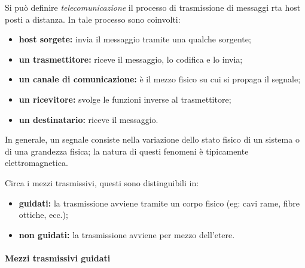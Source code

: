 \documentclass{subfiles}
\begin{document}
Si può definire \emph{telecomunicazione} il processo di trasmissione di messaggi rta host posti a distanza.
In tale processo sono coinvolti:
\begin{itemize}
    \item \textbf{host sorgete:} invia il messaggio tramite una qualche sorgente;
    \item \textbf{un trasmettitore:} riceve il messaggio, lo codifica e lo invia;
    \item \textbf{un canale di comunicazione:} è il mezzo fisico su cui si propaga il segnale;
    \item \textbf{un ricevitore:} svolge le funzioni inverse al trasmettitore;
    \item \textbf{un destinatario:} riceve il messaggio.
\end{itemize}

In generale, un segnale consiste nella variazione dello stato fisico di un sistema o di una grandezza fisica;
la natura di questi fenomeni è tipicamente elettromagnetica.

Circa i mezzi trasmissivi, questi sono distinguibili in:
\begin{itemize}
    \item \textbf{guidati:} la trasmissione avviene tramite un corpo fisico (eg: cavi rame, fibre ottiche, ecc.);
    \item \textbf{non guidati:} la trasmissione avviene per mezzo dell'etere.
\end{itemize}

\paragraph{Mezzi trasmissivi guidati}

\end{document}
